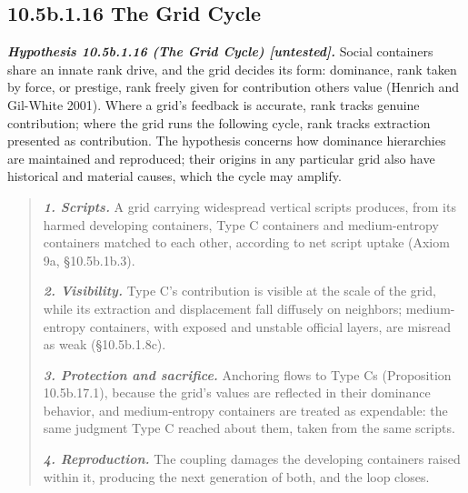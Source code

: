 \documentclass[
]{article}
\begin{document}
\hypertarget{b.1.16-the-grid-cycle}{%
\subsection{10.5b.1.16 The Grid Cycle}\label{b.1.16-the-grid-cycle}}

\emph{\textbf{Hypothesis 10.5b.1.16 (The Grid Cycle) {[}untested{]}.}}
Social containers share an innate rank drive, and the grid decides its
form: dominance, rank taken by force, or prestige, rank freely given for
contribution others value (Henrich and Gil-White 2001). Where a grid's
feedback is accurate, rank tracks genuine contribution; where the grid
runs the following cycle, rank tracks extraction presented as
contribution. The hypothesis concerns how dominance hierarchies are
maintained and reproduced; their origins in any particular grid also
have historical and material causes, which the cycle may amplify.

\begin{quote}
\emph{\textbf{1. Scripts.}} A grid carrying widespread vertical scripts
produces, from its harmed developing containers, Type C containers and
medium-entropy containers matched to each other, according to net script
uptake (Axiom 9a, §10.5b.1b.3).

\emph{\textbf{2. Visibility.}} Type C's contribution is visible at the
scale of the grid, while its extraction and displacement fall diffusely
on neighbors; medium-entropy containers, with exposed and unstable
official layers, are misread as weak (§10.5b.1.8c).

\emph{\textbf{3. Protection and sacrifice.}} Anchoring flows to Type Cs
(Proposition 10.5b.17.1), because the grid's values are reflected in
their dominance behavior, and medium-entropy containers are treated as
expendable: the same judgment Type C reached about them, taken from the
same scripts.

\emph{\textbf{4. Reproduction.}} The coupling damages the developing
containers raised within it, producing the next generation of both, and
the loop closes.
\end{quote}
\end{document}
